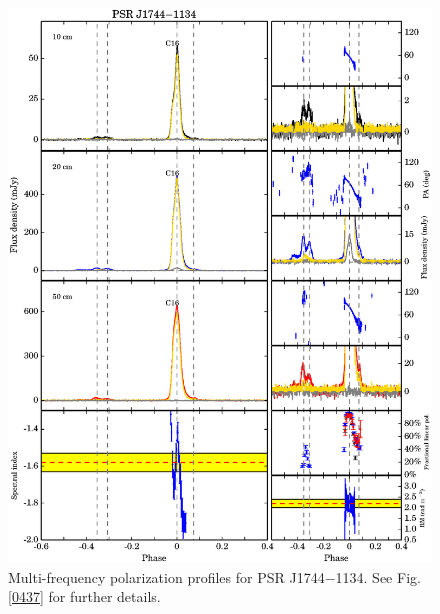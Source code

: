 \documentclass[useAMS,usenatbib]{mn2e}
\begin{document}
\begin{appendix}
\begin{figure}
\begin{center}
\includegraphics[width=6 in]{1744.ps}
\caption{Multi-frequency polarization profiles for PSR J1744$-$1134. 
See Fig. \ref{0437} for further details.}
\label{1744}
\end{center}
\end{figure}


\end{appendix}
\end{document}
